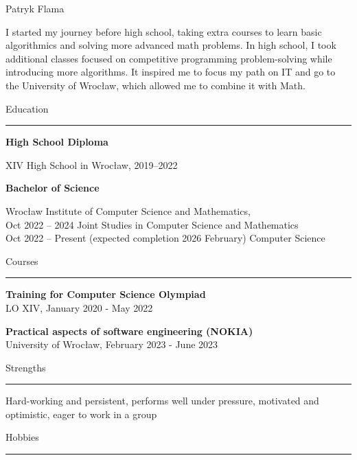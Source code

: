 \documentclass{letter}
\begin{document}
\hfill
\begin{minipage}[t]{0.60\textwidth}
\setlength{\baselineskip}{1.5\baselineskip}
\vspace{0.8cm}
{\huge Patryk Flama}

\vspace{0.3cm}

\begin{spacing}{1.125}
\small 
I started my journey before high school, taking extra courses to learn basic algorithmics and solving more advanced math problems. In high school, I took additional classes focused on competitive programming problem-solving while introducing more algorithms. It inspired me to focus my path on IT and go to the University of Wrocław, which allowed me to combine it with Math.
\end{spacing}

\vspace{0.3cm}

{\large Education}
\rule{\linewidth}{0.4pt}

{\large \textbf{High School Diploma}}

{\small XIV High School in Wrocław, 2019--2022}

{\large \textbf{Bachelor of Science}}

{\small Wrocław Institute of Computer Science and Mathematics, \\
Oct 2022 -- 2024 Joint Studies in Computer Science and Mathematics \\
Oct 2022 -- Present (expected completion 2026 February) Computer Science}

\vspace{0.3cm}

{\large Courses}
\rule{\linewidth}{0.4pt}

\textbf{Training for Computer Science Olympiad} \\
{\small  LO XIV, January 2020 - May 2022}

\textbf{Practical aspects of software engineering (NOKIA)} \\
{\small University of Wrocław, February 2023 - June 2023}

\vspace{0.3cm}

{\large Strengths}
\rule{\linewidth}{0.4pt}
Hard-working and persistent, performs well under pressure, motivated and optimistic, eager to work in a group

\vspace{0.3cm}

{\large Hobbies}
\rule{\linewidth}{0.4pt}


\end{minipage}
\end{document}
